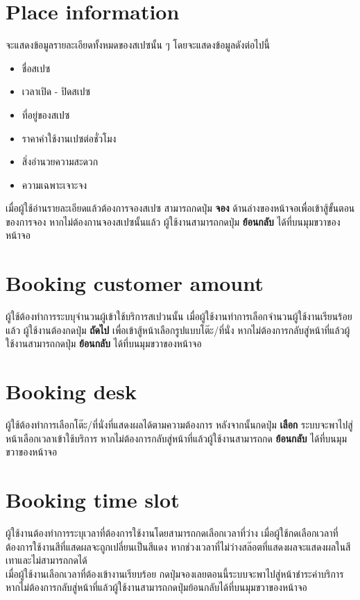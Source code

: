 \section{Place information}
จะแสดงข้อมูลรายละเอียดทั้งหมดของสเปซนั้น ๆ โดยจะแสดงข้อมูลดังต่อไปนี้
\begin{itemize}
    \item ชื่อสเปซ
    \item เวลาเปิด - ปิดสเปซ
    \item ที่อยู่ของสเปซ
    \item ราคาค่าใช้งานเปซต่อชั่วโมง
    \item สิ่งอำนวยความสะดวก
    \item ความเฉพาะเจาะจง
\end{itemize}
เมื่อผู้ใช้อ่านรายละเอียดแล้วต้องการจองสเปซ สามารถกดปุ่ม \textbf{จอง} ด้านล่างของหน้าจอเพื่อเข้าสู้ขั้นตอนของการจอง หากไม่ต้องกานจองสเปซนั้นแล้ว
ผู้ใช้งานสามารถกดปุ่ม \textbf{ย้อนกลับ} ได้ที่บนมุมขวาของหน้าจอ

\section{Booking  customer amount}
ผู้ใช้ต้องทำการระบบุจำนวนผู้เข้าใช้บริการสเปวนนั้น เมื่อผู้ใช้งานทำการเลือกจำนวนผู้ใช้งานเรียนร้อยแล้ว ผู้ใช้งานต้องกดปุ่ม \textbf{ถัดไป} เพื่อเข้าสู้หน้าเลือกรูปแบบโต๊ะ/ที่นั่ง
หากไม่ต้องการกลับสู่หน้าที่แล้วผู้ใช้งานสามารถกดปุ่ม \textbf{ย้อนกลับ} ได้ที่บนมุมขวาของหน้าจอ

\section{Booking desk}
ผู้ใช้ต้องทำการเลือกโต๊ะ/ที่นั่งที่แสดงผลได้ตามความต้องการ หลังจากนั้นกดปุ่ม \textbf{เลือก} ระบบจะพาไปสู่หน้าเลือกเวลาเข้าใช้บริการ
หากไม่ต้องการกลับสู่หน้าที่แล้วผู้ใช้งานสามารถกด \textbf{ย้อนกลับ} ได้ที่บนมุมขวาของหน้าจอ

\section{Booking time slot}
ผู้ใช้งานต้องทำการระบุเวลาที่ต้องการใช้งานโดยสามารถกดเลือกเวลาที่ว่าง เมื่อผู้ใช้กดเลือกเวลาที่ต้องการใช้งานสีที่แสดผลจะถูกเปลี่ยนเป็นสีแดง หากช่วงเวลาที่ไม่ว่างสล๊อตที่แสดงผลจะแสดงผลในสีเทาและไม่สามารถกดได้ \\
เมื่อผู้ใช้งานเลือกเวลาที่ต้องเข้างานเรียบร้อย กดปุ่มจองเลยตอนนี้ระบบจะพาไปสู่หน้าชำระค่าบริการ หากไม่ต้องการกลับสู่หน้าที่แล้วผู้ใช้งานสามารถกดปุ่มย้อนกลับได้ที่บนมุมขวาของหน้าจอ

